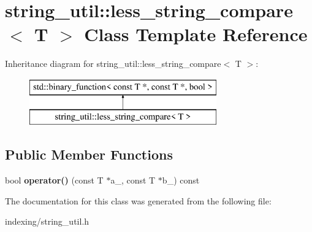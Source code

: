 \hypertarget{classstring__util_1_1less__string__compare}{\section{string\-\_\-util\-:\-:less\-\_\-string\-\_\-compare$<$ T $>$ Class Template Reference}
\label{classstring__util_1_1less__string__compare}
}
Inheritance diagram for string\-\_\-util\-:\-:less\-\_\-string\-\_\-compare$<$ T $>$\-:\begin{figure}[H]
\begin{center}
\leavevmode
\includegraphics[height=2.000000cm]{classstring__util_1_1less__string__compare}
\end{center}
\end{figure}
\subsection*{Public Member Functions}
\begin{DoxyCompactItemize}
\item 
\hypertarget{classstring__util_1_1less__string__compare_aa97df82edd8f7e33e5715acf71759337}{bool {\bfseries operator()} (const T $\ast$a\-\_\-, const T $\ast$b\-\_\-) const }\label{classstring__util_1_1less__string__compare_aa97df82edd8f7e33e5715acf71759337}

\end{DoxyCompactItemize}


The documentation for this class was generated from the following file\-:\begin{DoxyCompactItemize}
\item 
indexing/string\-\_\-util.\-h\end{DoxyCompactItemize}
